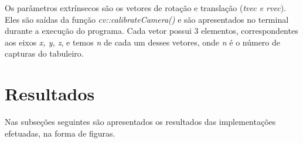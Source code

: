 \documentclass{bmvc2k}
\begin{document}
Os parâmetros extrínsecos são os vetores de rotação e translação (\textit{tvec e rvec}). Eles são saídas da função \textit{cv::calibrateCamera()} e são apresentados no terminal durante a execução do programa. Cada vetor possui 3 elementos, correspondentes aos eixos \textit{x, y, z}, e temos \textit{n} de cada um desses vetores, onde \textit{n} é o número de capturas do tabuleiro. 

%
%
%







\section{Resultados}
\label{sec:Results}

Nas subseções seguintes são apresentados os resultados das implementações efetuadas, na forma de figuras.
\end{document}
